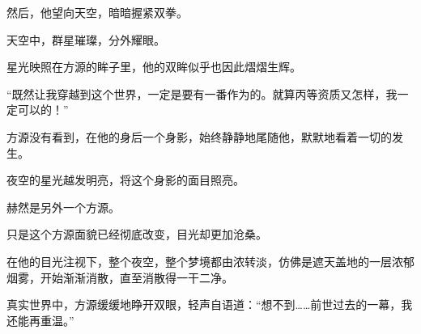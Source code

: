 \begin{this_body}
然后，他望向天空，暗暗握紧双拳。

天空中，群星璀璨，分外耀眼。

星光映照在方源的眸子里，他的双眸似乎也因此熠熠生辉。

“既然让我穿越到这个世界，一定是要有一番作为的。就算丙等资质又怎样，我一定可以的！”

方源没有看到，在他的身后一个身影，始终静静地尾随他，默默地看着一切的发生。

夜空的星光越发明亮，将这个身影的面目照亮。

赫然是另外一个方源。

只是这个方源面貌已经彻底改变，目光却更加沧桑。

在他的目光注视下，整个夜空，整个梦境都由浓转淡，仿佛是遮天盖地的一层浓郁烟雾，开始渐渐消散，直至消散得一干二净。

真实世界中，方源缓缓地睁开双眼，轻声自语道：“想不到……前世过去的一幕，我还能再重温。”

\end{this_body}

